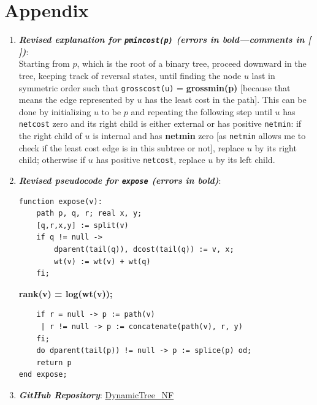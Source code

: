 \documentclass[a4paper, 11pt]{article}
\begin{document}
\section{Appendix}
\begin{enumerate}
\item \textbf{\textit{Revised explanation for \texttt{pmincost(p)} (errors in bold—comments in [ ])}}: \\
Starting from \(p\), which is the root of a binary tree, proceed downward in the tree, keeping track of reversal states, until finding the node \(u\) last in symmetric order such that \texttt{grosscost(u)} = \textbf{grossmin(p)} [because that means the edge represented by \(u\) has the least cost in the path]. This can be done by initializing \(u\) to be \(p\) and repeating the following step until \(u\) has \texttt{netcost} zero and its right child is either external or has positive \texttt{netmin}: if the right child of \(u\) is internal and has \textbf{netmin} zero [as \texttt{netmin} allows me to check if the least cost edge is in this subtree or not], replace \(u\) by its right child; otherwise if \(u\) has positive \texttt{netcost}, replace \(u\) by its left child.

\item \textbf{\textit{Revised pseudocode for \texttt{expose} (errors in bold)}}:
\begin{verbatim}
function expose(v):
    path p, q, r; real x, y;
    [q,r,x,y] := split(v)
    if q != null ->
        dparent(tail(q)), dcost(tail(q)) := v, x;
        wt(v) := wt(v) + wt(q)
    fi;
\end{verbatim}
\-\hspace{0.9cm}\textbf{rank(v) = log(wt(v));}
\begin{verbatim}
    if r = null -> p := path(v)
     | r != null -> p := concatenate(path(v), r, y)
    fi;
    do dparent(tail(p)) != null -> p := splice(p) od;
    return p
end expose;
\end{verbatim}

\item \textbf{\textit{GitHub Repository}}: \href{https://github.com/Musab1Blaser/DynamicTrees_NF}{DynamicTree\_NF}
\end{enumerate}

\pagebreak


\end{document}

